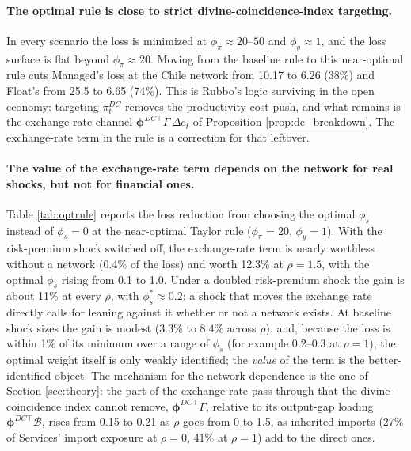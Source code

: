 \documentclass[12pt]{article}
\begin{document}
\paragraph{The optimal rule is close to strict divine-coincidence-index targeting.} In every scenario the loss is
minimized at $\phi_\pi\approx20$--$50$ and $\phi_y\approx1$, and the loss surface is flat beyond $\phi_\pi\approx20$.
Moving from the baseline rule to this near-optimal rule cuts Managed's loss at the Chile network from 10.17
to 6.26 (38\%) and Float's from 25.5 to 6.65 (74\%). This is Rubbo's logic surviving in the open economy: targeting
$\pi^{DC}_t$ removes the productivity cost-push, and what remains is the exchange-rate channel
$\bm\phi^{DC\top}\Gamma\,\Delta e_t$ of Proposition \ref{prop:dc_breakdown}. The exchange-rate term in the rule
is a correction for that leftover.

\paragraph{The value of the exchange-rate term depends on the network for real shocks, but not for financial ones.}
Table \ref{tab:optrule} reports the loss reduction from choosing the optimal $\phi_s$ instead of $\phi_s=0$ at the
near-optimal Taylor rule ($\phi_\pi=20$, $\phi_y=1$). With the risk-premium shock switched off, the exchange-rate
term is nearly worthless without a network (0.4\% of the loss) and worth 12.3\% at $\rho=1.5$, with the optimal
$\phi_s$ rising from 0.1 to 1.0. Under a doubled risk-premium shock the gain is about 11\% at every $\rho$, with
$\phi_s^*\approx0.2$: a shock that moves the exchange rate directly calls for leaning against it whether or not a
network exists. At baseline shock sizes the gain is modest ($3.3\%$ to $8.4\%$ across $\rho$), and, because the
loss is within 1\% of its minimum over a range of $\phi_s$ (for example 0.2--0.3 at $\rho=1$), the optimal
weight itself is only weakly identified; the \emph{value} of the term is the better-identified object. The
mechanism for the network dependence is the one of Section \ref{sec:theory}: the part of the exchange-rate
pass-through that the divine-coincidence index cannot remove, $\bm\phi^{DC\top}\Gamma$, relative to its
output-gap loading $\bm\phi^{DC\top}\mathcal B$, rises from 0.15 to 0.21 as $\rho$ goes from 0 to 1.5, as
inherited imports (27\% of Services' import exposure at $\rho=0$, 41\% at $\rho=1$) add to the direct ones.
\end{document}
